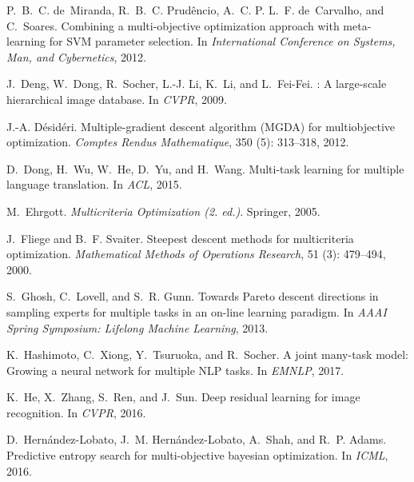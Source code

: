 \documentclass{article}
\begin{document}
{\begin{thebibliography}{60}
P.~B.~C. de~Miranda, R.~B.~C. Prud{\^{e}}ncio, A.~C. P. L.~F. de~Carvalho, and
  C.~Soares.
\newblock Combining a multi-objective optimization approach with meta-learning
  for {SVM} parameter selection.
\newblock In \emph{International Conference on Systems, Man, and Cybernetics},
  2012.

J.~Deng, W.~Dong, R.~Socher, L.-J. Li, K.~Li, and L.~Fei-Fei.
: A large-scale hierarchical image database.
\newblock In \emph{{CVPR}}, 2009.

J.-A. D{\'e}sid{\'e}ri.
\newblock Multiple-gradient descent algorithm {(MGDA)} for multiobjective
  optimization.
\newblock \emph{Comptes Rendus Mathematique}, 350 (5):
  313--318, 2012.

D.~Dong, H.~Wu, W.~He, D.~Yu, and H.~Wang.
\newblock Multi-task learning for multiple language translation.
\newblock In \emph{ACL}, 2015.

M.~Ehrgott.
\newblock \emph{Multicriteria Optimization {(2.} ed.)}.
\newblock Springer, 2005.

J.~Fliege and B.~F. Svaiter.
\newblock Steepest descent methods for multicriteria optimization.
\newblock \emph{Mathematical Methods of Operations Research}, 51
  (3): 479--494, 2000.

S.~Ghosh, C.~Lovell, and S.~R. Gunn.
\newblock Towards {Pareto} descent directions in sampling experts for multiple
  tasks in an on-line learning paradigm.
\newblock In \emph{AAAI Spring Symposium: Lifelong Machine Learning}, 2013.

K.~Hashimoto, C.~Xiong, Y.~Tsuruoka, and R.~Socher.
\newblock A joint many-task model: Growing a neural network for multiple {NLP}
  tasks.
\newblock In \emph{EMNLP}, 2017.

K.~He, X.~Zhang, S.~Ren, and J.~Sun.
\newblock Deep residual learning for image recognition.
\newblock In \emph{{CVPR}}, 2016.

D.~Hern{\'{a}}ndez{-}Lobato, J.~M. Hern{\'{a}}ndez{-}Lobato, A.~Shah, and R.~P.
  Adams.
\newblock Predictive entropy search for multi-objective bayesian optimization.
\newblock In \emph{{ICML}}, 2016.


\end{thebibliography}}
\end{document}
